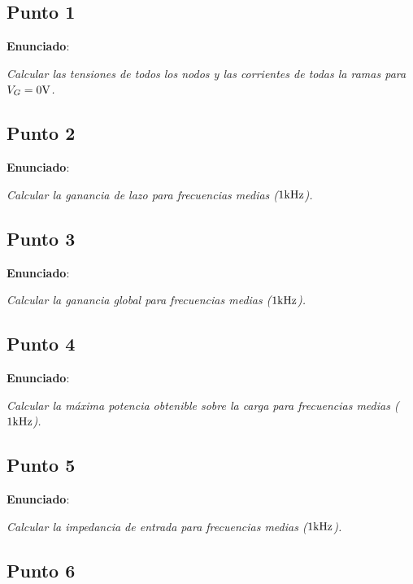 
\subsection{Punto 1}

\textbf{Enunciado}: 

\textsl{Calcular las tensiones de todos los nodos y las corrientes de todas la ramas para $V_{G} = 0 \si[per-mode=symbol]{\volt}$.}



\subsection{Punto 2}

\textbf{Enunciado}: 

\textsl{Calcular la ganancia de lazo para frecuencias medias ($1 \si[per-mode=symbol]{\kilo\hertz}$).}



\subsection{Punto 3}
\label{global_gain}
\textbf{Enunciado}: 

\textsl{Calcular la ganancia global para frecuencias medias ($1 \si[per-mode=symbol]{\kilo\hertz}$).}



\subsection{Punto 4}

\textbf{Enunciado}:
 
\textsl{Calcular la máxima potencia obtenible sobre la carga para frecuencias medias ($1 \si[per-mode=symbol]{\kilo\hertz}$).}



\subsection{Punto 5}

\textbf{Enunciado}: 

\textsl{Calcular la impedancia de entrada para frecuencias medias ($1 \si[per-mode=symbol]{\kilo\hertz}$).}



\subsection{Punto 6}

